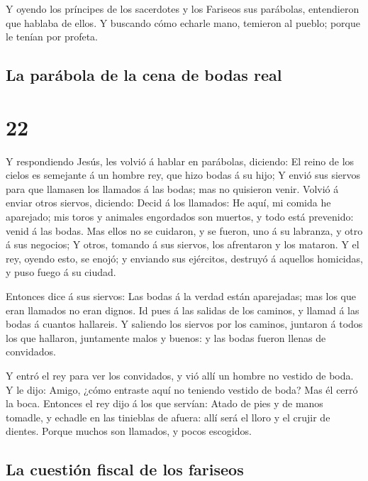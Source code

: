  Y oyendo los príncipes de los sacerdotes y los Fariseos
sus parábolas, entendieron que hablaba de ellos.  Y
buscando cómo echarle mano, temieron al pueblo; porque le tenían por
profeta.

\hypertarget{la-paruxe1bola-de-la-cena-de-bodas-real}{%
\subsection{La parábola de la cena de bodas
real}\label{la-paruxe1bola-de-la-cena-de-bodas-real}}

\hypertarget{section-21}{%
\section{22}\label{section-21}}

 Y respondiendo Jesús, les volvió á hablar en parábolas,
diciendo:  El reino de los cielos es semejante á un hombre
rey, que hizo bodas á su hijo;  Y envió sus siervos para
que llamasen los llamados á las bodas; mas no quisieron venir.
 Volvió á enviar otros siervos, diciendo: Decid á los
llamados: He aquí, mi comida he aparejado; mis toros y animales
engordados son muertos, y todo está prevenido: venid á las bodas.
 Mas ellos no se cuidaron, y se fueron, uno á su labranza,
y otro á sus negocios;  Y otros, tomando á sus siervos,
los afrentaron y los mataron.  Y el rey, oyendo esto, se
enojó; y enviando sus ejércitos, destruyó á aquellos homicidas, y puso
fuego á su ciudad.

 Entonces dice á sus siervos: Las bodas á la verdad están
aparejadas; mas los que eran llamados no eran dignos.  Id
pues á las salidas de los caminos, y llamad á las bodas á cuantos
hallareis.  Y saliendo los siervos por los caminos,
juntaron á todos los que hallaron, juntamente malos y buenos: y las
bodas fueron llenas de convidados.

 Y entró el rey para ver los convidados, y vió allí un
hombre no vestido de boda.  Y le dijo: Amigo, ¿cómo
entraste aquí no teniendo vestido de boda? Mas él cerró la boca.
 Entonces el rey dijo á los que servían: Atado de pies y
de manos tomadle, y echadle en las tinieblas de afuera: allí será el
lloro y el crujir de dientes.  Porque muchos son
llamados, y pocos escogidos.

\hypertarget{la-cuestiuxf3n-fiscal-de-los-fariseos}{%
\subsection{La cuestión fiscal de los
fariseos}\label{la-cuestiuxf3n-fiscal-de-los-fariseos}}

